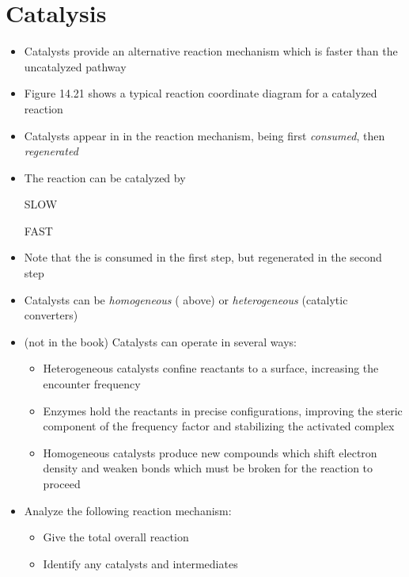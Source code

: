 \documentclass[12pt, openany, letterpaper]{memoir}
\begin{document}
\section{Catalysis}
\begin{itemize}
	\item Catalysts provide an alternative reaction mechanism which is faster than the uncatalyzed pathway
	\item Figure 14.21 shows a typical reaction coordinate diagram for a catalyzed reaction
	\item Catalysts appear in in the reaction mechanism, being first \emph{consumed}, then \emph{regenerated}
	\item The reaction  can be catalyzed by 
	
	 \hspace{1em} SLOW
	
	 \hspace{1em} FAST
	\item Note that the  is consumed in the first step, but regenerated in the second step
	\item Catalysts can be \emph{homogeneous} ( above) or \emph{heterogeneous} (catalytic converters)
	\item (not in the book) Catalysts can operate in several ways:
	\begin{itemize}
		\item Heterogeneous catalysts confine reactants to a surface, increasing the encounter frequency
		\item Enzymes hold the reactants in precise configurations, improving the steric component of the frequency factor and stabilizing the activated complex
		\item Homogeneous catalysts produce new compounds which shift electron density and weaken bonds which must be broken for the reaction to proceed
	\end{itemize}
	\item Analyze the following reaction mechanism:
	
	
	
	\begin{itemize}
		\item Give the total overall reaction
		\item Identify any catalysts and intermediates
	\end{itemize}
\end{itemize}
\end{document}
